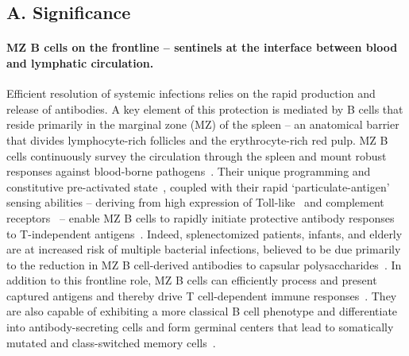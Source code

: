 \documentclass[11pt]{article}
\newcommand{\para}[1]{\vspace*{-4.5mm}\paragraph{#1}}
\newcommand{\red}[1]{{\color{red}{#1}}}
\begin{document}
\pagestyle{empty}

\setlength{\parskip}{1.5mm}





\subsection*{A. Significance}
\vspace{0.4cm}
\para{MZ B cells on the frontline -- sentinels at the interface between blood and lymphatic circulation.}
Efficient resolution of systemic infections relies on the rapid production and release of antibodies. 
A key element of this protection is mediated by B cells that reside primarily in the marginal zone (MZ) of the spleen -- an anatomical barrier that divides  lymphocyte-rich follicles and the erythrocyte-rich red pulp. 
MZ B cells continuously survey the  circulation through the spleen and mount robust responses against blood-borne pathogens~\cite{Kumararatne_1981, Kraal_1992, Schmidt_1993, Martin_2001, Zandvoort_2002}. 
Their unique programming and constitutive pre-activated state~\cite{Oliver_1997, Martin_2001, Martin_2002, Cerutti_2013}, coupled with their rapid `particulate-antigen' sensing abilities  -- deriving from high expression of Toll-like~\cite{Rubtsov_2008, Bialecki_2009} and complement receptors~\cite{Gray_1984, Dempsey_1996} -- enable MZ B cells to rapidly initiate protective antibody responses to T-independent antigens~\cite{Guinamard_2000, Martin_2001, Martin_Kearney_2000, Balazs_2002, Won_2002, Zandvoort_2002}.
Indeed, splenectomized patients, infants, and elderly are at increased risk of multiple bacterial infections, believed to be due primarily to the reduction in MZ B cell-derived antibodies to capsular polysaccharides~\cite{Amlot_1985, Brigden_1999, Guinamard_2000,  Castagnola_2003, Kruetzmann_2003, Kruschinski_2004, Sagaert_2007}.
In addition to this frontline role, MZ B cells can  efficiently process and present captured antigens and thereby drive T cell-dependent immune responses~\cite{Oliver_1999, Attanavanich_2004,  Cinamon_2007}. 
They are also capable of exhibiting a more classical B cell phenotype and differentiate into antibody-secreting cells and form germinal centers that lead to somatically mutated and class-switched memory cells~\cite{Tierens_1999, Song_2003, Hendricks_2011, Chappell_2012, Hendricks_2018}. %
\end{document}
